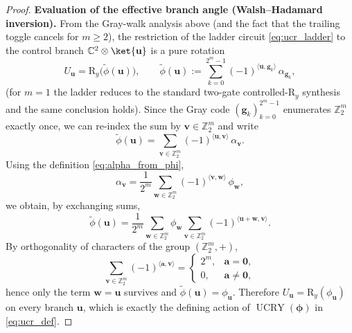 \documentclass{article}
\DeclareMathOperator{\UCRY}{UCRY}
\newcommand{\RY}{\mathrm{R}_y}
\numberwithin{equation}{section}
\begin{document}
\begin{proof}
\smallskip
\noindent\textbf{Evaluation of the effective branch angle (Walsh--Hadamard inversion).}
From the Gray-walk analysis above (and the fact that the trailing toggle cancels for $m\ge2$), the restriction of
the ladder circuit \eqref{eq:ucr_ladder} to the control branch $\mathbb{C}^2 \otimes \ket{\mathbf{u}}$ is a pure rotation
\[
U_{\mathbf{u}}=\RY\!\bigl(\widetilde{\phi}(\mathbf{u})\bigr),
\qquad
\widetilde{\phi}(\mathbf{u}):=\sum_{k=0}^{2^m-1}(-1)^{\langle \mathbf{u},\mathbf{g}_k\rangle}\,\alpha_{\mathbf{g}_k},
\]
(for $m=1$ the ladder reduces to the standard two-gate controlled-$\RY$ synthesis and the same conclusion holds).
Since the Gray code $(\mathbf{g}_k)_{k=0}^{2^m-1}$ enumerates $\mathbb{Z}_2^m$ exactly once, we can re-index the sum by
$\mathbf{v}\in\mathbb{Z}_2^m$ and write
\[
\widetilde{\phi}(\mathbf{u})
=
\sum_{\mathbf{v}\in\mathbb{Z}_2^m}(-1)^{\langle \mathbf{u},\mathbf{v}\rangle}\,\alpha_{\mathbf{v}}.
\]
Using the definition \eqref{eq:alpha_from_phi},
\[
\alpha_{\mathbf{v}}
=\frac{1}{2^m}\sum_{\mathbf{w}\in\mathbb{Z}_2^m}(-1)^{\langle \mathbf{v},\mathbf{w}\rangle}\,\phi_{\mathbf{w}},
\]
we obtain, by exchanging sums,
\[
\widetilde{\phi}(\mathbf{u})
=\frac{1}{2^m}\sum_{\mathbf{w}\in\mathbb{Z}_2^m}\phi_{\mathbf{w}}
\sum_{\mathbf{v}\in\mathbb{Z}_2^m}(-1)^{\langle \mathbf{u}+\mathbf{w},\mathbf{v}\rangle}.
\]
By orthogonality of characters of the group $(\mathbb{Z}_2^m,+)$,
\[
\sum_{\mathbf{v}\in\mathbb{Z}_2^m}(-1)^{\langle \mathbf{a},\mathbf{v}\rangle}
=
\begin{cases}
2^m, & \mathbf{a}=\mathbf{0},\\
0, & \mathbf{a}\neq \mathbf{0},
\end{cases}
\]
hence only the term $\mathbf{w}=\mathbf{u}$ survives and $\widetilde{\phi}(\mathbf{u})=\phi_{\mathbf{u}}$.
Therefore $U_{\mathbf{u}}=\RY(\phi_{\mathbf{u}})$ on every branch $\mathbf{u}$, which is exactly the defining action of
$\UCRY(\bm{\phi})$ in \eqref{eq:ucr_def}.
\end{proof}
\end{document}
